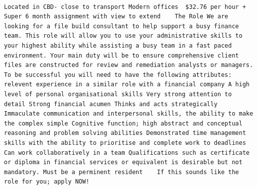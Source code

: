 \documentclass[11pt,a4paper,]{article}
\begin{document}
\begin{verbatim}
                                                                                                                                                                           Located in CBD- close to transport Modern offices  $32.76 per hour + Super 6 month assignment with view to extend    The Role We are looking for a file build consultant to help support a busy finance team. This role will allow you to use your administrative skills to your highest ability while assisting a busy team in a fast paced environment. Your main duty will be to ensure comprehensive client files are constructed for review and remediation analysts or managers. To be successful you will need to have the following attributes:   relevent experience in a similar role with a financial company A high level of personal organisational skills Very strong attention to detail Strong financial acumen Thinks and acts strategically Immaculate communication and interpersonal skills, the ability to make the complex simple Cognitive function; high abstract and conceptual reasoning and problem solving abilities Demonstrated time management skills with the ability to prioritise and complete work to deadlines Can work collaboratively in a team Qualifications such as certificate or diploma in financial services or equivalent is desirable but not mandatory. Must be a perminent resident    If this sounds like the role for you; apply NOW!

\end{verbatim}
\end{document}
